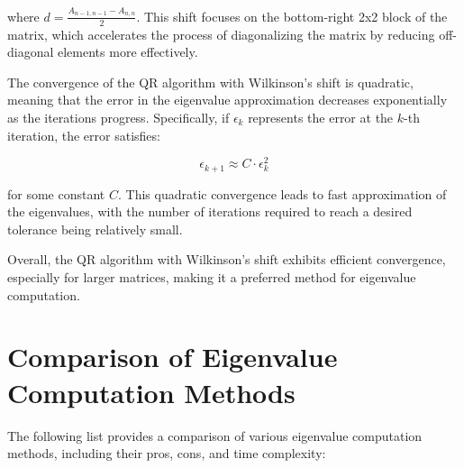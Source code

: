 \documentclass[journal]{IEEEtran}
\begin{document}
where \( d = \frac{A_{n-1,n-1} - A_{n,n}}{2} \). This shift focuses on the bottom-right 2x2 block of the matrix, which accelerates the process of diagonalizing the matrix by reducing off-diagonal elements more effectively.

The convergence of the QR algorithm with Wilkinson's shift is quadratic, meaning that the error in the eigenvalue approximation decreases exponentially as the iterations progress. Specifically, if \( \epsilon_k \) represents the error at the \( k \)-th iteration, the error satisfies:

\[
\epsilon_{k+1} \approx C \cdot \epsilon_k^2
\]

for some constant \( C \). This quadratic convergence leads to fast approximation of the eigenvalues, with the number of iterations required to reach a desired tolerance being relatively small.

Overall, the QR algorithm with Wilkinson's shift exhibits efficient convergence, especially for larger matrices, making it a preferred method for eigenvalue computation.
\section{Comparison of Eigenvalue Computation Methods}

The following list provides a comparison of various eigenvalue computation methods, including their pros, cons, and time complexity:
\end{document}
